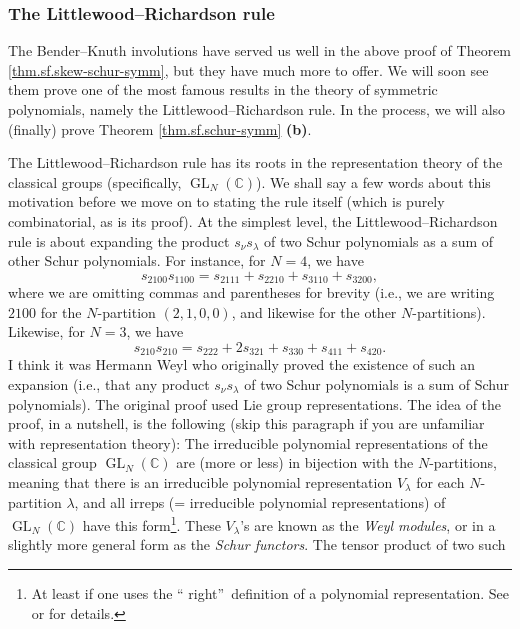 \subsubsection{The Littlewood--Richardson rule}

The Bender--Knuth involutions have served us well in the above proof of
Theorem \ref{thm.sf.skew-schur-symm}, but they have much more to offer. We
will soon see them prove one of the most famous results in the theory of
symmetric polynomials, namely the Littlewood--Richardson rule. In the process,
we will also (finally) prove Theorem \ref{thm.sf.schur-symm} \textbf{(b)}.

The Littlewood--Richardson rule has its roots in the representation theory of
the classical groups (specifically, $\operatorname*{GL}\nolimits_{N}\left(
\mathbb{C}\right)  $). We shall say a few words about this motivation before
we move on to stating the rule itself (which is purely combinatorial, as is
its proof). At the simplest level, the Littlewood--Richardson rule is about
expanding the product $s_{\nu}s_{\lambda}$ of two Schur polynomials as a sum
of other Schur polynomials. For instance, for $N=4$, we have%
\[
s_{2100}s_{1100}=s_{2111}+s_{2210}+s_{3110}+s_{3200},
\]
where we are omitting commas and parentheses for brevity (i.e., we are writing
$2100$ for the $N$-partition $\left(  2,1,0,0\right)  $, and likewise for the
other $N$-partitions). Likewise, for $N=3$, we have%
\[
s_{210}s_{210}=s_{222}+2s_{321}+s_{330}+s_{411}+s_{420}.
\]
I think it was Hermann Weyl who originally proved the existence of such an
expansion (i.e., that any product $s_{\nu}s_{\lambda}$ of two Schur
polynomials is a sum of Schur polynomials). The original proof used Lie group
representations. The idea of the proof, in a nutshell, is the following (skip
this paragraph if you are unfamiliar with representation theory): The
irreducible polynomial representations of the classical group
$\operatorname*{GL}\nolimits_{N}\left(  \mathbb{C}\right)  $ are (more or
less) in bijection with the $N$-partitions, meaning that there is an
irreducible polynomial representation $V_{\lambda}$ for each $N$-partition
$\lambda$, and all irreps (= irreducible polynomial representations) of
$\operatorname*{GL}\nolimits_{N}\left(  \mathbb{C}\right)  $ have this
form\footnote{At least if one uses the \textquotedblleft
right\textquotedblright\ definition of a polynomial representation. See
\cite[\S 5 and \S 6]{KraPro10} or \cite[\S 6.1]{Prasad-rep} for details.}.
These $V_{\lambda}$'s are known as the \emph{Weyl modules}, or in a slightly
more general form as the \emph{Schur functors}. The tensor product of two such
